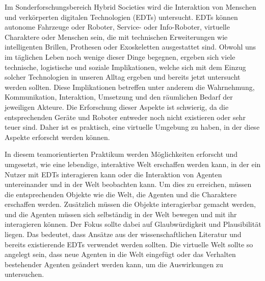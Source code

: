 
Im Sonderforschungsbereich Hybrid Societies wird die Interaktion von Menschen und
verkörperten digitalen Technologien (EDTs) untersucht. EDTs können autonome Fahrzeuge oder Roboter, Service- oder Info-Roboter, virtuelle Charaktere oder Menschen sein,
die mit technischen Erweiterungen wie intelligenten Brillen, Prothesen oder Exoskeletten
ausgestattet sind. Obwohl uns im täglichen Leben noch wenige dieser Dinge begegnen,
ergeben sich viele technische, logistische und soziale Implikationen, welche sich mit dem
Einzug solcher Technologien in unseren Alltag ergeben und bereits jetzt untersucht werden
sollten. Diese Implikationen betreffen unter anderem die Wahrnehmung, Kommunikation,
Interaktion, Umsetzung und den räumlichen Bedarf der jeweiligen Akteure. Die Erforschung dieser Aspekte ist schwierig, da die entsprechenden Geräte und Roboter entweder
noch nicht existieren oder sehr teuer sind. Daher ist es praktisch, eine virtuelle Umgebung
zu haben, in der diese Aspekte erforscht werden können.


In diesem teamorientierten Praktikum werden Möglichkeiten erforscht und umgesetzt,
wie eine lebendige, interaktive Welt erschaffen werden kann, in der ein Nutzer mit EDTs
interagieren kann oder die Interaktion von Agenten untereinander und in der Welt beobachten kann. Um dies zu erreichen, müssen die entsprechenden Objekte wie die Welt, die
Agenten und die Charaktere erschaffen werden. Zusätzlich müssen die Objekte interagierbar gemacht werden, und die Agenten müssen sich selbständig in der Welt bewegen und
mit ihr interagieren können. Der Fokus sollte dabei auf Glaubwürdigkeit und Plausibilität
liegen. Das bedeutet, dass Ansätze aus der wissenschaftlichen Literatur und bereits existierende EDTs verwendet werden sollten. Die virtuelle Welt sollte so angelegt sein, dass neue
Agenten in die Welt eingefügt oder das Verhalten bestehender Agenten geändert werden
kann, um die Auswirkungen zu untersuchen.